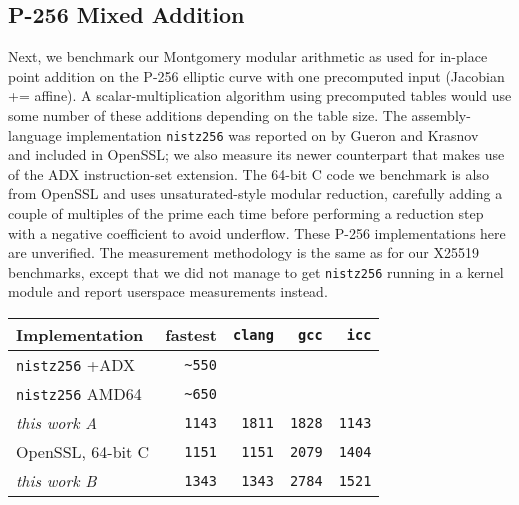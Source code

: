 \documentclass[conference,letterpaper]{IEEEtran}
\begin{document}
\subsection{P-256 Mixed Addition}

Next, we benchmark our Montgomery modular arithmetic as used for in-place point addition on the P-256 elliptic curve with one precomputed input (Jacobian += affine).
A scalar-multiplication algorithm using precomputed tables would use some number of these additions depending on the table size.
The assembly-language implementation \texttt{nistz256} was reported on by Gueron and Krasnov~\cite{nistz256} and included in OpenSSL; we also measure its newer counterpart that makes use of the ADX instruction-set extension.
The 64-bit C code we benchmark is also from OpenSSL and uses unsaturated-style modular reduction, carefully adding a couple of multiples of the prime each time before performing a reduction step with a negative coefficient to avoid underflow.
These P-256 implementations here are unverified.
The measurement methodology is the same as for our X25519 benchmarks, except that we did not manage to get \texttt{nistz256} running in a kernel module and report userspace measurements instead.

\begin{center}\begin{tabular}[]{lrrrr}
  Implementation        & fastest       & \texttt{clang}& \texttt{gcc}& \texttt{icc} \\
\hline
  \texttt{nistz256} +ADX &  \verb|~550|  &  &  &  \\
  \texttt{nistz256} AMD64&  \verb|~650|  &  &  &  \\
  \textit{this work A}   &  \verb|1143|  & \texttt{1811}& \texttt{1828}& \texttt{1143}\\
  OpenSSL, 64-bit C      &  \verb|1151|  & \texttt{1151}& \texttt{2079}& \texttt{1404}\\
  \textit{this work B}   &  \verb|1343|  & \texttt{1343}& \texttt{2784}& \texttt{1521}\\
\hline
\end{tabular}\end{center}
\end{document}

